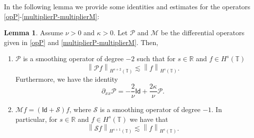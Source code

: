 \documentclass[reqno]{amsart}
\newcommand{\norm}[1]{\left\lVert#1\right\rVert}
\theoremstyle{definition}
\newtheorem{lemma}[theorem]{Lemma}
\numberwithin{equation}{section}
\numberwithin{theorem}{section}
\numberwithin{definition}{section}
\begin{document}
In the following lemma we provide some identities and estimates for the operators \eqref{opP}-\eqref{multiplierP-multiplierM}:

\begin{lemma}\label{lemma:op} 
Assume $\nu>0$ and $\kappa>0$. Let $\mathcal{P}$ and $\mathcal{M}$ be the differential operators given in \eqref{opP} and \eqref{multiplierP-multiplierM}. Then,
\begin{enumerate}
\item $\mathcal{P}$ is a smoothing operator of degree $-2$ such that for $s\in\mathbb{R}$ and $f\in H^{s}(\mathbb{T})$ 
\begin{equation}\label{estimate:P:smooth}
\norm{\mathcal{P}f}_{H^{s+2}(\mathbb{T})}\lesssim  \norm{f}_{H^{s}(\mathbb{T})}.
\end{equation}
Furthermore, we have the identity
\begin{equation}\label{twoder:helm}
\partial_{xx}\mathcal{P}=-\frac{2}{\nu}\mathsf{Id}+\frac{2\kappa }{\nu}\mathcal{P}.
\end{equation}

\item $\mathcal{M}f=\left(\mathsf{Id}+\mathcal{S}\right)f$,
where $\mathcal{S}$ is a smoothing operator of degree $-1$. In particular, for $s\in\mathbb{R}$ and $f\in H^{s}(\mathbb{T})$ we have that
\begin{equation}\label{bound:smooth}
\norm{\mathcal{S}f}_{H^{s+1}(\mathbb{T})}\lesssim  \norm{f}_{H^{s}(\mathbb{T})}.
\end{equation}

\end{enumerate} 
\end{lemma}
\end{document}
